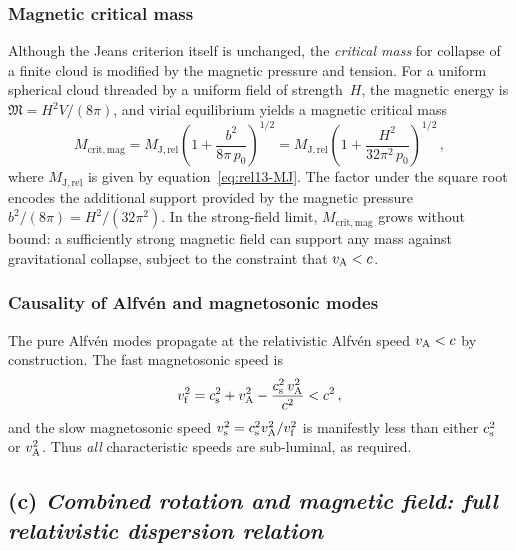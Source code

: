 \subsubsection*{Magnetic critical mass}

Although the Jeans criterion itself is unchanged, the \emph{critical
mass} for collapse of a finite cloud is modified by the magnetic
pressure and tension.  For a uniform spherical cloud threaded by a
uniform field of strength~$H$, the magnetic energy is
$\mathfrak{M} = H^{2}V/(8\pi)$, and virial equilibrium yields a
magnetic critical mass
\begin{equation}
  M_{\mathrm{crit,mag}}
  = M_{\mathrm{J,rel}}
    \left(1 + \frac{b^{2}}{8\pi\,p_{0}}\right)^{1/2}
  = M_{\mathrm{J,rel}}
    \left(1 + \frac{H^{2}}{32\pi^{2}\,p_{0}}\right)^{1/2}\,,
  \label{eq:rel13-Mcrit-mag}
\end{equation}
where $M_{\mathrm{J,rel}}$ is given by equation~\eqref{eq:rel13-MJ}.
The factor under the square root encodes the additional support provided
by the magnetic pressure $b^{2}/(8\pi) = H^{2}/(32\pi^{2})$.  In the
strong-field limit, $M_{\mathrm{crit,mag}}$ grows without bound: a
sufficiently strong magnetic field can support any mass against
gravitational collapse, subject to the constraint that $v_{\mathrm{A}} < c$.

\subsubsection*{Causality of Alfv\'en and magnetosonic modes}

The pure Alfv\'en modes propagate at the relativistic Alfv\'en speed
$v_{\mathrm{A}} < c$ by construction.  The fast magnetosonic speed is
\begin{equation}
  v_{\mathrm{f}}^{2}
  = c_{\mathrm{s}}^{2} + v_{\mathrm{A}}^{2} - \frac{c_{\mathrm{s}}^{2}\,v_{\mathrm{A}}^{2}}{c^{2}} < c^{2}\,,
  \label{eq:rel13-vfast}
\end{equation}
and the slow magnetosonic speed
$v_{\mathrm{s}}^{2} = c_{\mathrm{s}}^{2}v_{\mathrm{A}}^{2}/v_{\mathrm{f}}^{2}$ is
manifestly less than either $c_{\mathrm{s}}^{2}$ or $v_{\mathrm{A}}^{2}$.  Thus
\emph{all} characteristic speeds are sub-luminal, as required.

\subsection*{(c) \textit{Combined rotation and magnetic field: full
  relativistic dispersion relation}}
\label{subsec:rel-120c}

